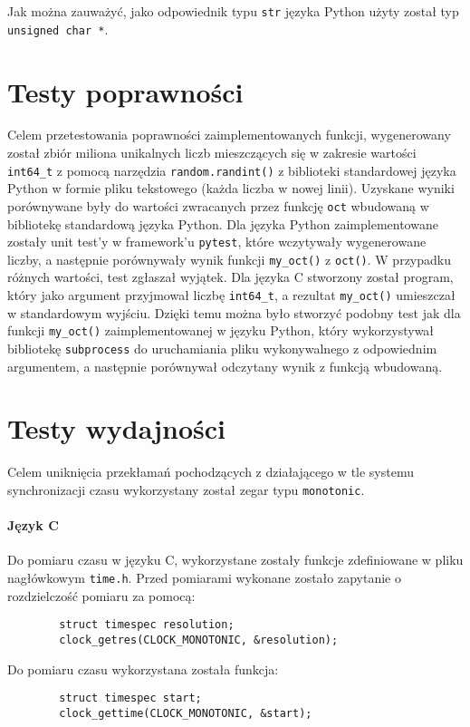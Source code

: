 \documentclass[11pt]{article}
\begin{document}
	Jak można zauważyć, jako odpowiednik typu \texttt{str} języka Python użyty został typ \texttt{unsigned char *}.

	\section{Testy poprawności}
	\justify
	Celem przetestowania poprawności zaimplementowanych funkcji, 
	wygenerowany został zbiór miliona unikalnych liczb mieszczących się w zakresie wartości \texttt{int64\_t} 
	z pomocą narzędzia \texttt{random.randint()} z biblioteki standardowej języka Python w formie pliku tekstowego
	(każda liczba w nowej linii). Uzyskane wyniki porównywane były do wartości zwracanych przez funkcję \texttt{oct}
	wbudowaną w bibliotekę standardową języka Python.
	\justify
	Dla języka Python zaimplementowane zostały unit test'y w framework'u \texttt{pytest}, które wczytywały wygenerowane
	liczby, a następnie porównywały wynik funkcji \texttt{my\_oct()} z \texttt{oct()}. W przypadku różnych wartości, test zgłaszał wyjątek.
	\justify
	Dla języka C stworzony został program, który jako argument przyjmował liczbę \texttt{int64\_t}, a rezultat \texttt{my\_oct()}
	umieszczał w standardowym wyjściu. Dzięki temu można było stworzyć podobny test jak dla funkcji \texttt{my\_oct()} zaimplementowanej w języku Python, który wykorzystywał
	bibliotekę \texttt{subprocess} do uruchamiania pliku wykonywalnego z odpowiednim argumentem, a następnie porównywał odczytany wynik z funkcją wbudowaną.
	
	\section{Testy wydajności}
		Celem uniknięcia przekłamań pochodzących z działającego w tle systemu synchronizacji czasu
		wykorzystany został zegar typu \texttt{monotonic}.

		\paragraph{Język C}
		Do pomiaru czasu w języku C, wykorzystane zostały funkcje zdefiniowane w pliku nagłówkowym \texttt{time.h}.
		Przed pomiarami wykonane zostało zapytanie o rozdzielczość pomiaru za pomocą:
		\begin{lstlisting}
		struct timespec resolution;
		clock_getres(CLOCK_MONOTONIC, &resolution);
		\end{lstlisting}
		Do pomiaru czasu wykorzystana została funkcja:
		\begin{lstlisting}
		struct timespec start;
		clock_gettime(CLOCK_MONOTONIC, &start);
		\end{lstlisting}
\end{document}

